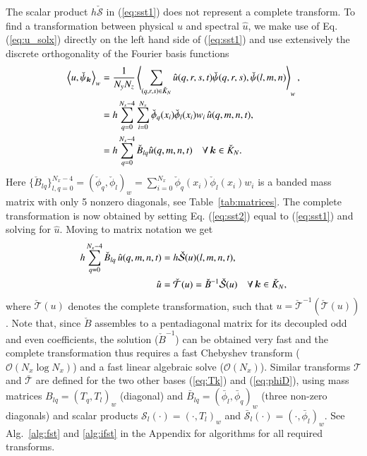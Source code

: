 \documentclass[preprint]{elsarticle}
\newcommand{\N}[1]{\check{#1}}
\newcommand{\D}[1]{\bar{#1}}
\begin{document}
The scalar product  $h\N{\mathcal{S}}$ in (\ref{eq:sst1}) does not represent a 
complete transform. To find a transformation between physical $u$ and spectral 
$\hat{u}$, we make use of Eq. (\ref{eq:u_solx}) directly on the left hand side of (\ref{eq:sst1}) and use extensively the discrete 
orthogonality of the Fourier basis functions
\begin{align}
\left<u, \N{\psi}_{\bm{k}}\right>_w &= \frac{1}{N_yN_z}\left< 
\sum_{(q,r,s) \in \N{K}_N} \hat{u}(q,r,s,t) \N{\psi}(q,r,s), 
\N{\psi}(l,m,n) \right>_w, \notag \\
           &= h \sum_{q=0}^{N_x-4} \sum_{i=0}^{N_x} \N{\phi}_{q}(x_i) 
           \N{\phi}_{l}(x_i) w_i \, \hat{u}(q, {m}, {n}, t), \notag \\
           &= h \sum_{q=0}^{N_x-4} \N{B}_{lq} \hat{u}(q, {m}, {n}, t) \quad \forall \, \bm{k} \in \N{K}_N. 
           \label{eq:sst2}
\end{align}
Here $\{\N{B}_{lq}\}_{l,q=0}^{N_x-4} = (\N{\phi}_q, \N{\phi}_l)_w = 
\sum_{i=0}^{N_x} \N{\phi}_{q}(x_i) \N{\phi}_{l}(x_i) w_i$ is a 
banded mass matrix with only 5 nonzero diagonals, see Table~\ref{tab:matrices}. The complete transformation is now obtained by 
setting Eq. (\ref{eq:sst2}) equal to (\ref{eq:sst1}) and solving for $\hat{u}$. 
Moving to matrix notation we get
\begin{align}
h\sum_{q=0}^{N_x-4} \N{B}_{lq}\, \hat{u}(q, {m}, {n}, t) &= 
h\N{\mathcal{S}}(u)(l, m, n, t), \notag \\
 \hat{u} &= \N{\mathcal{T}}(u) =  \N{B}^{-1}\N{\mathcal{S}}(u) 
 \quad \forall \, \bm{k} \in \N{K}_N, \label{eq:fstB}
\end{align}
where $\N{\mathcal{T}}(u)$ denotes the complete transformation, such that $u = 
\N{\mathcal{T}}^{-1}(\N{\mathcal{T}}(u))$. Note that, since $\N{B}$ assembles to 
a pentadiagonal matrix for its decoupled odd and even coefficients, the solution ($\N{B}^{-1}$) can be obtained very fast and the complete 
transformation thus requires a fast Chebyshev transform ($\mathcal{O}(N_x \log N_x)$) and 
a fast linear algebraic solve ($\mathcal{O}(N_x)$). Similar transforms $\mathcal{T}$ 
and $\D{\mathcal{T}}$ are defined for the two other bases (\ref{eq:Tk}) and 
(\ref{eq:phiD}), using mass matrices $B_{lq}=(T_q, T_l)_w$ (diagonal) and 
$\D{B}_{lq}=(\D{\phi}_l, \D{\phi}_q)_w$ (three non-zero diagonals) and scalar products 
$\mathcal{S}_l(\cdot) = (\cdot, T_l)_w$ and $\D{\mathcal{S}}_l(\cdot) = (\cdot, 
\D{\phi}_l)_w$. See Alg.~\ref{alg:fst} and \ref{alg:ifst} in the Appendix for algorithms for all required transforms.
\end{document}
